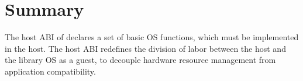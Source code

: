 \section{Summary}
\label{sec:abi:summary}

The host ABI of \graphene{}
declares a set of basic OS functions, which must be implemented in the host.
The host ABI redefines the division of labor
between the host and the library OS as a guest,
to decouple hardware resource management from application compatibility.